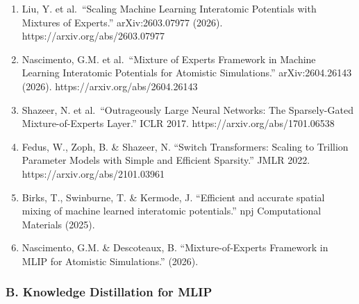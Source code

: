 \documentclass[
  12pt,
]{ctexart}
\providecommand{\tightlist}{%
  \setlength{\itemsep}{0pt}\setlength{\parskip}{0pt}}
\begin{document}
\begin{enumerate}
\def\labelenumi{\arabic{enumi}.}
\tightlist
\item
  Liu, Y. et al.~``Scaling Machine Learning Interatomic Potentials with
  Mixtures of Experts.'' arXiv:2603.07977 (2026).
  https://arxiv.org/abs/2603.07977
\item
  Nascimento, G.M. et al.~``Mixture of Experts Framework in Machine
  Learning Interatomic Potentials for Atomistic Simulations.''
  arXiv:2604.26143 (2026). https://arxiv.org/abs/2604.26143
\item
  Shazeer, N. et al.~``Outrageously Large Neural Networks: The
  Sparsely-Gated Mixture-of-Experts Layer.'' ICLR 2017.
  https://arxiv.org/abs/1701.06538
\item
  Fedus, W., Zoph, B. \& Shazeer, N. ``Switch Transformers: Scaling to
  Trillion Parameter Models with Simple and Efficient Sparsity.'' JMLR
  2022. https://arxiv.org/abs/2101.03961
\item
  Birks, T., Swinburne, T. \& Kermode, J. ``Efficient and accurate
  spatial mixing of machine learned interatomic potentials.'' npj
  Computational Materials (2025).
\item
  Nascimento, G.M. \& Descoteaux, B. ``Mixture-of-Experts Framework in
  MLIP for Atomistic Simulations.'' (2026).
\end{enumerate}

\subsubsection{B. Knowledge Distillation for
MLIP}\label{b.-knowledge-distillation-for-mlip-1}
\end{document}
